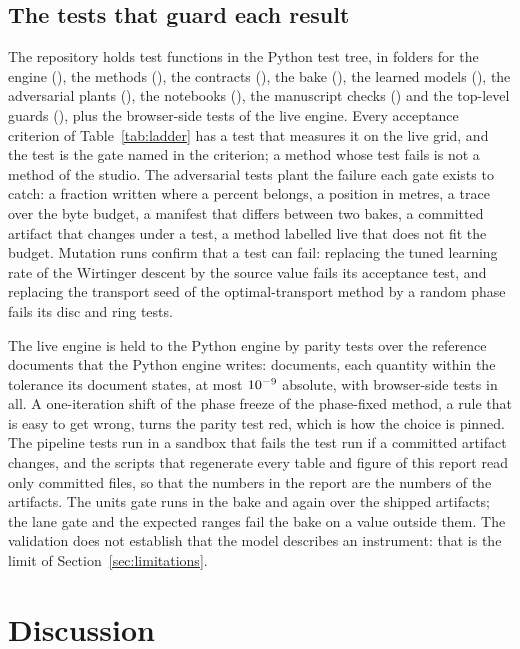 \subsection{The tests that guard each result}\label{sec:validation-tests}

The repository holds \nTestsTotal{} test functions in the Python test tree, in folders for the engine (), the methods (), the contracts (), the bake (), the learned models (), the adversarial plants (), the notebooks (), the manuscript checks () and the top-level guards (), plus the browser-side tests of the live engine. Every acceptance criterion of Table~\ref{tab:ladder} has a test that measures it on the live grid, and the test is the gate named in the criterion; a method whose test fails is not a method of the studio. The adversarial tests plant the failure each gate exists to catch: a fraction written where a percent belongs, a position in metres, a trace over the byte budget, a manifest that differs between two bakes, a committed artifact that changes under a test, a method labelled live that does not fit the budget. Mutation runs confirm that a test can fail: replacing the tuned learning rate of the Wirtinger descent by the source value fails its acceptance test, and replacing the transport seed of the optimal-transport method by a random phase fails its disc and ring tests.

The live engine is held to the Python engine by parity tests over the reference documents that the Python engine writes: \liveFixtures{} documents, each quantity within the tolerance its document states, at most $10^{-9}$ absolute, with \liveTests{} browser-side tests in all. A one-iteration shift of the phase freeze of the phase-fixed method, a rule that is easy to get wrong, turns the parity test red, which is how the choice is pinned. The pipeline tests run in a sandbox that fails the test run if a committed artifact changes, and the scripts that regenerate every table and figure of this report read only committed files, so that the numbers in the report are the numbers of the artifacts. The units gate runs in the bake and again over the shipped artifacts; the lane gate and the expected ranges fail the bake on a value outside them. The validation does not establish that the model describes an instrument: that is the limit of Section~\ref{sec:limitations}.

\section{Discussion}\label{sec:discussion}

